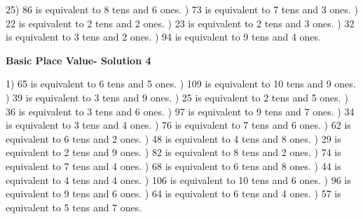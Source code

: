 \documentclass{article}%
\begin{document}
25) 86 is equivalent to  8 tens and 6 ones.%
) 73 is equivalent to  7 tens and 3 ones.%
) 22 is equivalent to  2 tens and 2 ones.%
) 23 is equivalent to  2 tens and 3 ones.%
) 32 is equivalent to  3 tens and 2 ones.%
) 94 is equivalent to  9 tens and 4 ones.%
\newline%
\newpage%
\large%
\begin{center}%
\textbf{Basic Place Value- Solution 4}%
\newline%
\end{center} \normalsize%
1) 65 is equivalent to  6 tens and 5 ones.%
) 109 is equivalent to  10 tens and 9 ones.%
) 39 is equivalent to  3 tens and 9 ones.%
) 25 is equivalent to  2 tens and 5 ones.%
) 36 is equivalent to  3 tens and 6 ones.%
) 97 is equivalent to  9 tens and 7 ones.%
) 34 is equivalent to  3 tens and 4 ones.%
) 76 is equivalent to  7 tens and 6 ones.%
) 62 is equivalent to  6 tens and 2 ones.%
) 48 is equivalent to  4 tens and 8 ones.%
) 29 is equivalent to  2 tens and 9 ones.%
) 82 is equivalent to  8 tens and 2 ones.%
) 74 is equivalent to  7 tens and 4 ones.%
) 68 is equivalent to  6 tens and 8 ones.%
) 44 is equivalent to  4 tens and 4 ones.%
) 106 is equivalent to  10 tens and 6 ones.%
) 96 is equivalent to  9 tens and 6 ones.%
) 64 is equivalent to  6 tens and 4 ones.%
) 57 is equivalent to  5 tens and 7 ones.%
\newline%
\end{document}
